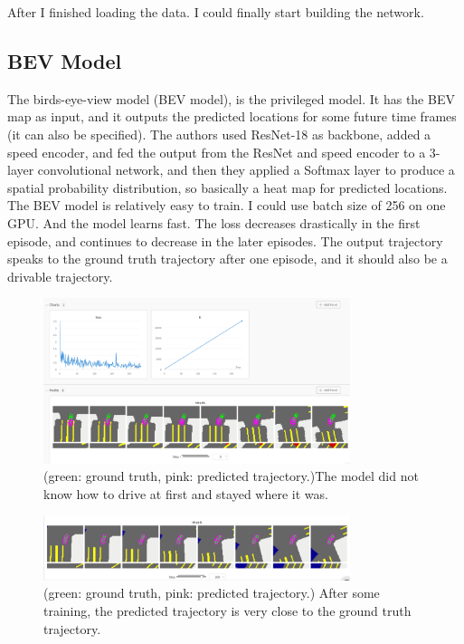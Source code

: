 \documentclass[inputenc=utf8]{ldvarticle}
\begin{document}
\noindent After I finished loading the data. I could finally start building the network.


\subsection {BEV Model}
The birds-eye-view model (BEV model), is the privileged model. It has the BEV map as input, and it outputs the predicted locations for some future time frames (it can also be specified). The authors used ResNet-18 as backbone, added a speed encoder, and fed the output from the ResNet and speed encoder to a 3-layer convolutional network, and then they applied a Softmax layer to produce a spatial probability distribution, so basically a heat map for predicted locations.
\\

\noindent The BEV model is relatively easy to train. I could use batch size of 256 on one GPU. And the model learns fast. The loss decreases drastically in the first episode, and continues to decrease in the later episodes. The output trajectory speaks to the ground truth trajectory after one episode, and it should also be a drivable trajectory.
\begin{figure}[H]
  \centering
  \includegraphics[width=0.8\textwidth] {bilder/cool_microwave_1.png} %
  \caption{(green: ground truth, pink: predicted trajectory.)The model did not know how to drive at first and stayed where it was.}
\end{figure}

\begin{figure}[H]
  \centering
  \includegraphics[width=0.8\textwidth] {bilder/cool_microwave_2.png} 
  \caption{(green: ground truth, pink: predicted trajectory.) After some training, the predicted trajectory is very close to the ground truth trajectory. }
\end{figure}
\end{document}
